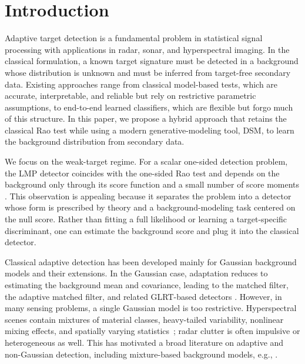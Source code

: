 \chapter{Introduction}
\label{chap:intro}

Adaptive target detection is a fundamental problem in statistical signal
processing with applications in radar, sonar, and hyperspectral imaging. In
the classical formulation, a known target signature must be detected in a
background whose distribution is unknown and must be inferred from
target-free secondary data. Existing approaches range from classical
model-based tests, which are accurate, interpretable, and reliable but rely on restrictive parametric assumptions, to
end-to-end learned classifiers, which are flexible but forgo much of this
structure. In this paper, we propose a hybrid approach that retains the
classical Rao test while using a modern generative-modeling tool, DSM, to learn the background distribution from secondary data.

We focus on the weak-target regime. For a scalar one-sided detection problem, the LMP detector coincides with the one-sided Rao test and depends on the background only through its score function and a small number of score moments \cite{kay1998detection,kay1989asymptotically}. This observation is appealing because it separates the problem into a detector whose form is prescribed by theory and a background-modeling task centered on the null score. Rather than fitting a full likelihood or learning a target-specific discriminant, one can estimate the background score and plug it into the classical detector.


Classical adaptive detection has been developed mainly for Gaussian background models and their extensions. In the Gaussian case, adaptation reduces to estimating the background mean and covariance, leading to the matched filter, the adaptive matched filter, and related GLRT-based detectors \cite{kelly1986adaptive,robey1992cfar,kay1998detection,vinGRLT}. However, in many sensing problems, a single Gaussian model is too restrictive. Hyperspectral scenes contain mixtures of material classes, heavy-tailed variability, nonlinear mixing effects, and spatially varying statistics~\cite{manolakis02,manolakis2014detection}; radar clutter is often impulsive or heterogeneous as well. This has motivated a broad literature on adaptive and non-Gaussian detection, including mixture-based background models, e.g., \cite{levin2019cluster}. 


